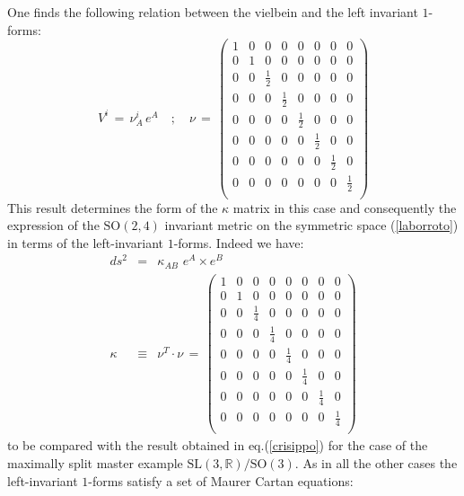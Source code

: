 \documentclass[10pt,a4paper]{article}
\begin{document}
One finds the following relation between the vielbein and the left invariant $1$-forms:
\begin{equation}\label{carmelitano}
  V^i \, = \, \nu^i_A \, e^A\quad ; \quad \nu \, = \, \left(
\begin{array}{cccccccc}
 1 & 0 & 0 & 0 & 0 & 0 & 0 & 0 \\
 0 & 1 & 0 & 0 & 0 & 0 & 0 & 0 \\
 0 & 0 & \frac{1}{2} & 0 & 0 & 0 & 0 & 0 \\
 0 & 0 & 0 & \frac{1}{2} & 0 & 0 & 0 & 0 \\
 0 & 0 & 0 & 0 & \frac{1}{2} & 0 & 0 & 0 \\
 0 & 0 & 0 & 0 & 0 & \frac{1}{2} & 0 & 0 \\
 0 & 0 & 0 & 0 & 0 & 0 & \frac{1}{2} & 0 \\
 0 & 0 & 0 & 0 & 0 & 0 & 0 & \frac{1}{2} \\
\end{array}
\right)
\end{equation}
This result determines the form of the $\kappa$ matrix in this case and consequently
the expression of the $\mathrm{SO(2,4)}$  invariant metric on the symmetric space (\ref{laborroto}) in terms of the left-invariant $1$-forms. Indeed we have:
\begin{eqnarray}\label{barnabone}
  ds^2 & =& \kappa_{AB}\, \, e^A \times e^B \nonumber\\
  \kappa & \equiv & \nu^T\cdot\nu \, = \, \left(
\begin{array}{cccccccc}
 1 & 0 & 0 & 0 & 0 & 0 & 0 & 0 \\
 0 & 1 & 0 & 0 & 0 & 0 & 0 & 0 \\
 0 & 0 & \frac{1}{4} & 0 & 0 & 0 & 0 & 0 \\
 0 & 0 & 0 & \frac{1}{4} & 0 & 0 & 0 & 0 \\
 0 & 0 & 0 & 0 & \frac{1}{4} & 0 & 0 & 0 \\
 0 & 0 & 0 & 0 & 0 & \frac{1}{4} & 0 & 0 \\
 0 & 0 & 0 & 0 & 0 & 0 & \frac{1}{4} & 0 \\
 0 & 0 & 0 & 0 & 0 & 0 & 0 & \frac{1}{4} \\
\end{array}
\right)
\end{eqnarray}
to be compared with the result obtained in eq.(\ref{crisippo}) for the case of the maximally split master example $\mathrm{SL(3,\mathbb{R})/SO(3)}$.  As in all the other cases the left-invariant $1$-forms satisfy a set of  Maurer Cartan equations:
\end{document}
